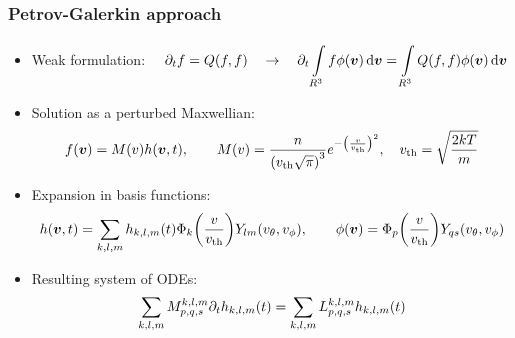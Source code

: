 \documentclass[mathserif, aspectratio=169]{beamer}
\newcommand{\ud}{\,\mathrm{d}}
\newcommand{\vect}[1]{\boldsymbol{#1}}
\newcommand{\of}[1]{\mleft( #1 \mright)}
\newcommand{\vth}{v_{\textrm{th}}}
\newcommand{\myint}[2]{\int\limits_{#1}^{#2}}
\begin{document}
\begin{frame}
\frametitle{Petrov-Galerkin approach}
%
\small
\begin{itemize}

\item Weak formulation:
$
\displaystyle
\quad
\partial_t f = Q(f,f)
\quad \rightarrow \quad
\partial_t \myint{R^3}{} f \phi\of{\vect{v}} \ud \vect{v} =
\myint{R^3}{} Q(f,f) \phi\of{\vect{v}} \ud \vect{v}
$

\item Solution as a perturbed Maxwellian:
\begin{align*}
f\of{\vect{v}} = M\of{v} h\of{\vect{v},t}
, \quad\quad
M\of{v} = \frac{n}{\left( \vth \sqrt{\pi} \right)^3} e^{-\left(\frac{v}{\vth}\right)^2}
, \quad
\vth = \sqrt{\frac{2kT}{m}}
\end{align*}

\item Expansion in basis functions:
\begin{align*}
h\of{\vect{v},t} =
\sum_{k,l,m} h_{k,l,m} \of{t} \Phi_k\of{\frac{v}{\vth}} Y_{lm}\of{v_\theta, v_\phi},
\quad
\quad
\phi\of{\vect{v}} = \Phi_p\of{\frac{v}{\vth}} Y_{qs}\of{v_\theta, v_\phi}
\end{align*}

\item Resulting system of ODEs:
\begin{align*}
\sum_{k,l,m} M_{p,q,s}^{k,l,m} \partial_t h_{k,l,m}\of{t} = \sum_{k,l,m}  L_{p,q,s}^{k,l,m} h_{k,l,m}\of{t}
\end{align*}
\end{itemize}
%
\end{frame}
\end{document}
